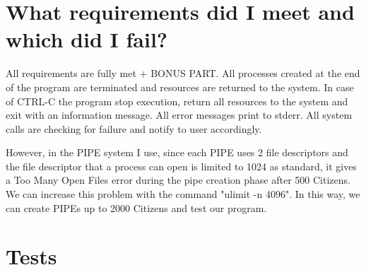 \documentclass{article}
\begin{document}
\section{What requirements did I meet and which did I fail?}
\quad All requirements are fully met + BONUS PART. All processes created at the end of the program are terminated and resources are returned to the system. In case of CTRL-C the program stop execution, return all resources to the system and exit with an information message. All error messages  print to stderr. All system calls are checking for failure and  notify to user accordingly.
\par However, in the PIPE system I use, since each PIPE uses 2 file descriptors and the file descriptor that a process can open is limited to 1024 as standard, it gives a Too Many Open Files error during the pipe creation phase after 500 Citizens. We can increase this problem with the command "ulimit -n 4096". In this way, we can create PIPEs up to 2000 Citizens and test our program.\\


\section{Tests}
\end{document}
